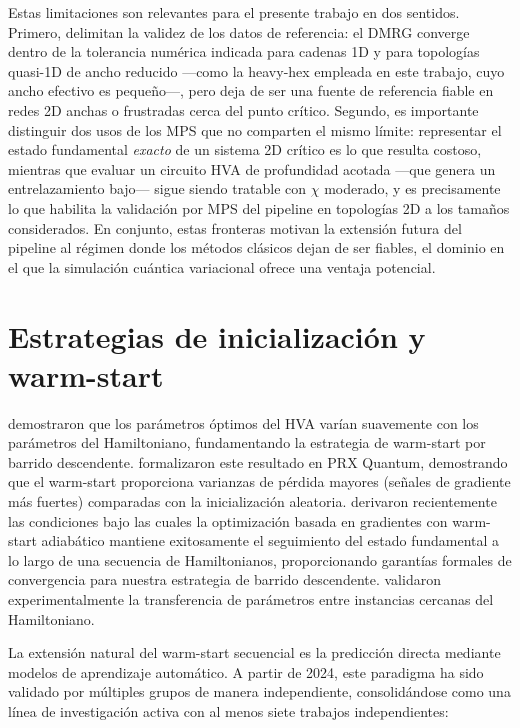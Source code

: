\documentclass[11pt,a4paper,spanish]{book}
\begin{document}
Estas limitaciones son relevantes para el presente trabajo en dos sentidos. Primero, delimitan la validez de los datos de referencia: el DMRG converge dentro de la tolerancia numérica indicada para cadenas 1D y para topologías quasi-1D de ancho reducido ---como la heavy-hex empleada en este trabajo, cuyo ancho efectivo es pequeño---, pero deja de ser una fuente de referencia fiable en redes 2D anchas o frustradas cerca del punto crítico. Segundo, es importante distinguir dos usos de los MPS que no comparten el mismo límite: representar el estado fundamental \emph{exacto} de un sistema 2D crítico es lo que resulta costoso, mientras que evaluar un circuito HVA de profundidad acotada ---que genera un entrelazamiento bajo--- sigue siendo tratable con $\chi$ moderado, y es precisamente lo que habilita la validación por MPS del pipeline en topologías 2D a los tamaños considerados. En conjunto, estas fronteras motivan la extensión futura del pipeline al régimen donde los métodos clásicos dejan de ser fiables, el dominio en el que la simulación cuántica variacional ofrece una ventaja potencial.


\section{Estrategias de inicialización y warm-start}

\citet{mele2022} demostraron que los parámetros óptimos del HVA varían suavemente con los parámetros del Hamiltoniano, fundamentando la estrategia de warm-start por barrido descendente. \citet{puig2025} formalizaron este resultado en PRX Quantum, demostrando que el warm-start proporciona varianzas de pérdida mayores (señales de gradiente más fuertes) comparadas con la inicialización aleatoria. \citet{schiffer2026} derivaron recientemente las condiciones bajo las cuales la optimización basada en gradientes con warm-start adiabático mantiene exitosamente el seguimiento del estado fundamental a lo largo de una secuencia de Hamiltonianos, proporcionando garantías formales de convergencia para nuestra estrategia de barrido descendente. \citet{skogh2023} validaron experimentalmente la transferencia de parámetros entre instancias cercanas del Hamiltoniano.

La extensión natural del warm-start secuencial es la predicción directa mediante modelos de aprendizaje automático. A partir de 2024, este paradigma ha sido validado por múltiples grupos de manera independiente, consolidándose como una línea de investigación activa con al menos siete trabajos independientes:
\end{document}
